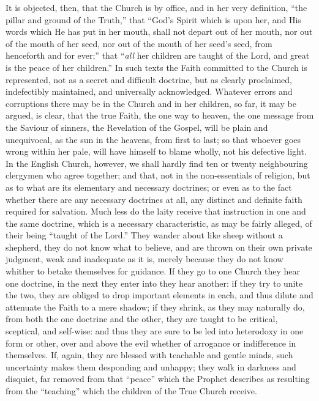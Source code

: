 It is objected, then, that the Church is by office, and in her very
definition, ``the pillar and ground of the Truth,'' that
``God's Spirit which is upon her, and His words which He has
put in her mouth, shall not depart out of her mouth, nor out of the
mouth of her seed, nor out of the mouth of her seed's seed, from
henceforth and for ever;'' that ``\emph{all} her children are taught
of the Lord, and great is the peace of her children.'' In such
texts the Faith committed to the Church is represented, not as a
secret and difficult doctrine, but as clearly proclaimed, indefectibly
maintained, and universally acknowledged. Whatever errors and
corruptions there may be in the Church and in her children, so far, it
may be argued, is clear, that the true Faith, the one way to heaven,
the one message from the Saviour of sinners, the Revelation of the
Gospel, will be plain and unequivocal, as the sun in the heavens, from
first to last; so that whoever goes wrong within her pale, will have
himself to blame wholly, not his defective light. In the English
Church, however, we shall hardly find ten or twenty neighbouring
clergymen who agree together; and that, not in the non-essentials of
religion, but as to what are its elementary and necessary doctrines;
or even as to the fact whether there are any necessary doctrines at
all, any distinct and definite faith required for salvation. Much less
do the laity receive that instruction in one and the same doctrine,
which is a necessary characteristic, as may be fairly alleged, of
their being ``taught of the Lord.'' They wander about like
sheep without a shepherd, they do not know what to believe, and are
thrown on their own private judgment, weak and inadequate as it is,
merely because they do not know whither to betake themselves for
guidance. If they go to one Church they hear one doctrine, in the next
they enter into they hear another: if they try to unite the two, they
are obliged to drop important elements in each, and thus dilute and
attenuate the Faith to a mere shadow; if they shrink, as they may
naturally do, from both the one doctrine and the other, they are
taught to be critical, sceptical, and self-wise: and thus they
are sure to be led into heterodoxy in one form or other, over and
above the evil whether of arrogance or indifference in themselves. If,
again, they are blessed with teachable and gentle minds, such
uncertainty makes them desponding and unhappy; they walk in darkness
and disquiet, far removed from that ``peace'' which the
Prophet describes as resulting from the ``teaching'' which the
children of the True Church receive.

